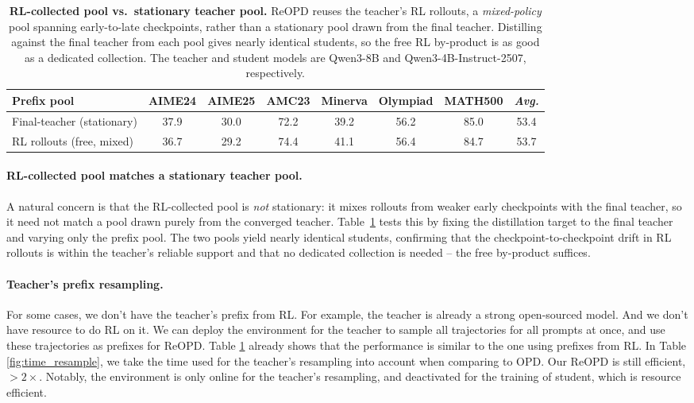 \begin{table}[t]
    \caption{\textbf{RL-collected pool vs.\ stationary teacher pool.} ReOPD reuses the
    teacher's RL rollouts, a \emph{mixed-policy} pool spanning early-to-late checkpoints,
    rather than a stationary pool drawn from the final teacher. Distilling against the
    final teacher from each pool gives nearly identical students, so the free RL
    by-product is as good as a dedicated collection. The teacher and student models are
    Qwen3-8B and Qwen3-4B-Instruct-2507, respectively.}
    \label{tab:pool_source}
    \small
    \centering
    \begin{tabular}{lccccccc}
        \toprule
            \textbf{Prefix pool} & \textbf{AIME24} & \textbf{AIME25} & \textbf{AMC23} & \textbf{Minerva} & \textbf{Olympiad} & \textbf{MATH500} & \textbf{\textit{Avg.}} \\
        \midrule
            Final-teacher (stationary) & 37.9 & 30.0 & 72.2 & 39.2 & 56.2 & 85.0 & 53.4  \\
            \rowcolor{myblue}
            RL rollouts (free, mixed) & 36.7 & 29.2 & 74.4 & 41.1 & 56.4 & 84.7 & 53.7 \\
        \bottomrule
    \end{tabular}
\end{table}

\paragraph{RL-collected pool matches a stationary teacher pool.}
A natural concern is that the RL-collected pool is \emph{not} stationary: it mixes
rollouts from weaker early checkpoints with the final teacher, so it need not match a
pool drawn purely from the converged teacher. Table~\ref{tab:pool_source} tests this
by fixing the distillation target to the final teacher and varying only the prefix
pool. The two pools yield nearly identical students, confirming that the
checkpoint-to-checkpoint drift in RL rollouts is within the teacher's reliable support
and that no dedicated collection is needed -- the free by-product suffices.

\paragraph{Teacher's prefix resampling.}
For some cases, we don't have the teacher's prefix from RL. For example, the teacher is already a strong open-sourced model. And we don't have resource to do RL on it. We can deploy the environment for the teacher to sample all trajectories for all prompts at once, and use these trajectories as prefixes for ReOPD. Table \ref{tab:pool_source} already shows that the performance is similar to the one using prefixes from RL. In Table \ref{fig:time_resample}, we take the time used for the teacher's resampling into account when comparing to OPD. Our ReOPD is still efficient, $> 2\times$. Notably, the environment is only online for the teacher's resampling, and deactivated for the training of student, which is resource efficient.

